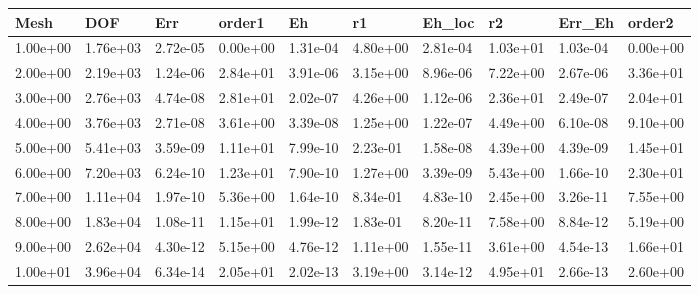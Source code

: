\begin{tabular}{llllllllll}
Mesh & DOF & Err & order1 & Eh & r1 & Eh_loc & r2 & Err_Eh & order2 \\ 
\hline 
1.00e+00 & 1.76e+03 & 2.72e-05 & 0.00e+00 & 1.31e-04 & 4.80e+00 & 2.81e-04 & 1.03e+01 & 1.03e-04 & 0.00e+00 \\ 
2.00e+00 & 2.19e+03 & 1.24e-06 & 2.84e+01 & 3.91e-06 & 3.15e+00 & 8.96e-06 & 7.22e+00 & 2.67e-06 & 3.36e+01 \\ 
3.00e+00 & 2.76e+03 & 4.74e-08 & 2.81e+01 & 2.02e-07 & 4.26e+00 & 1.12e-06 & 2.36e+01 & 2.49e-07 & 2.04e+01 \\ 
4.00e+00 & 3.76e+03 & 2.71e-08 & 3.61e+00 & 3.39e-08 & 1.25e+00 & 1.22e-07 & 4.49e+00 & 6.10e-08 & 9.10e+00 \\ 
5.00e+00 & 5.41e+03 & 3.59e-09 & 1.11e+01 & 7.99e-10 & 2.23e-01 & 1.58e-08 & 4.39e+00 & 4.39e-09 & 1.45e+01 \\ 
6.00e+00 & 7.20e+03 & 6.24e-10 & 1.23e+01 & 7.90e-10 & 1.27e+00 & 3.39e-09 & 5.43e+00 & 1.66e-10 & 2.30e+01 \\ 
7.00e+00 & 1.11e+04 & 1.97e-10 & 5.36e+00 & 1.64e-10 & 8.34e-01 & 4.83e-10 & 2.45e+00 & 3.26e-11 & 7.55e+00 \\ 
8.00e+00 & 1.83e+04 & 1.08e-11 & 1.15e+01 & 1.99e-12 & 1.83e-01 & 8.20e-11 & 7.58e+00 & 8.84e-12 & 5.19e+00 \\ 
9.00e+00 & 2.62e+04 & 4.30e-12 & 5.15e+00 & 4.76e-12 & 1.11e+00 & 1.55e-11 & 3.61e+00 & 4.54e-13 & 1.66e+01 \\ 
1.00e+01 & 3.96e+04 & 6.34e-14 & 2.05e+01 & 2.02e-13 & 3.19e+00 & 3.14e-12 & 4.95e+01 & 2.66e-13 & 2.60e+00 \\ 
\hline 
\end{tabular}
